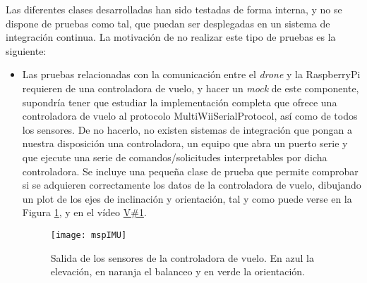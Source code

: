 Las diferentes clases desarrolladas han sido testadas de forma interna, y no se dispone de pruebas como tal, que puedan ser desplegadas en un sistema de integración continua. 
La motivación de no realizar este tipo de pruebas es la siguiente: 
\begin{itemize}
\item Las pruebas relacionadas con la comunicación entre el \emph{drone} y la RaspberryPi requieren de una controladora de vuelo, y hacer un \emph{mock} de este componente, supondría tener que estudiar la implementación completa que ofrece una controladora de vuelo al protocolo MultiWiiSerialProtocol, así como de todos los sensores. De no hacerlo, no existen sistemas de integración que pongan a nuestra disposición una controladora, un equipo que abra un puerto serie y que ejecute una serie de comandos/solicitudes interpretables por dicha controladora. Se incluye una pequeña clase de prueba que permite comprobar si se adquieren correctamente los datos de la controladora de vuelo, dibujando un plot de los ejes de inclinación y orientación, tal y como puede verse en la Figura \ref{fig:mspIMU}, y en el vídeo \href{https://universidaddeburgos-my.sharepoint.com/:v:/g/personal/mbm0089_alu_ubu_es/EezmUjB1BSdKp-_VQrUkIXwBPSrvQdSnmhSTd-QA3jJaIQ?e=RYEaIl}{V\#1}.
\begin{figure}
	\centering
	\texttt{[image: mspIMU]}
	\caption[Recepción de la IMU mediante MSPio]{Salida de los sensores de la controladora de vuelo. En azul la elevación, en naranja el balanceo y en verde la orientación.}\label{fig:mspIMU}
\end{figure}



\end{itemize}
